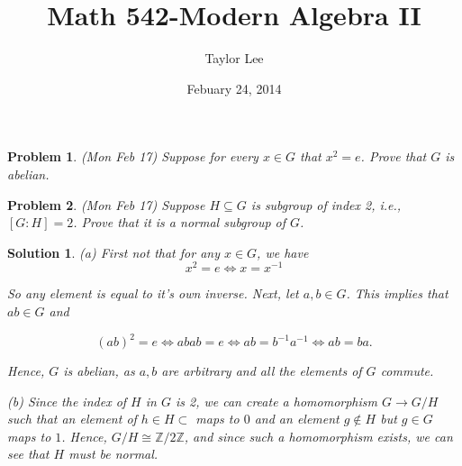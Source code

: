 \documentclass[12pt]{article}
\theoremstyle{moo}
\newtheorem*{prob}{Problem}
\newtheorem*{sol}{Solution}
\def\zz{{\mathbb Z}}
\def\su{\subseteq}
\begin{document}
\fontseries {\seriesdefault}
\fontshape {\shapedefault}
\selectfont

\title{ Math 542-Modern Algebra II}
\date{Febuary 24, 2014}         %
\author{Taylor Lee}      %
\maketitle                      %



\begin{prob}
(Mon Feb 17) Suppose for every $x\in G$ that $x^2=e$.  Prove
that $G$ is abelian.
\end{prob}

\begin{prob}
(Mon Feb 17) Suppose $H\su G$ is subgroup of index 2, i.e., 
$[G:H]=2$.  Prove that it is a normal subgroup of $G$.
\end{prob}



\begin{sol}
(a) First not that for any $x \in G$, we have 
\[
x^2 = e \Leftrightarrow x = x^{-1}
\]

So any element is equal to it's own inverse. Next, let $a,b \in G$. This implies that $ab \in G$ and

\[
\left( ab \right)^2 = e \Leftrightarrow abab = e \Leftrightarrow ab = b^{-1}a^{-1}  \Leftrightarrow ab = ba.
\]

Hence, $G$ is abelian, as $a,b$ are arbitrary and all the elements of $G$ commute.

(b) Since the index of $H$ in $G$ is 2, we can create a homomorphism $G \rightarrow G/H$ such that an element of $h \in H \subset$ maps to $0$ and an element $g \notin H$ but $g \in G$ maps to $1$. Hence, $G/H \cong \zz/ 2 \zz$, and since such a homomorphism exists, we can see that $H$ must be normal.


\end{sol}
\end{document}
